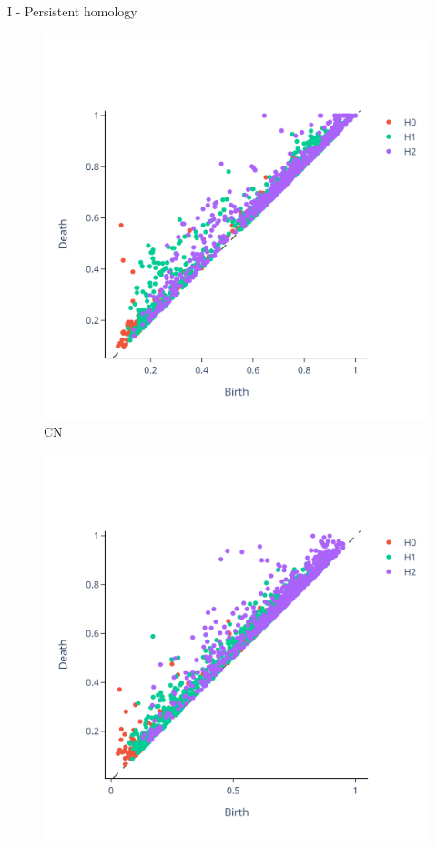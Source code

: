 \documentclass[aspectratio=169, 10pt, dvipsnames]{beamer}
\begin{document}
\begin{frame}[fragile]{I - Persistent homology}
  \begin{figure}
    \centering
    \includegraphics[width=\textwidth]{figures/PDs/persistence_diagram_CN.png}
    \caption{CN}
  \end{figure}
  \endminipage
  \hfill
  \begin{figure}
    \centering
    \includegraphics[width=\textwidth]{figures/PDs/persistence_diagram_MCI.png}

\end{figure}
\end{frame}
\end{document}
